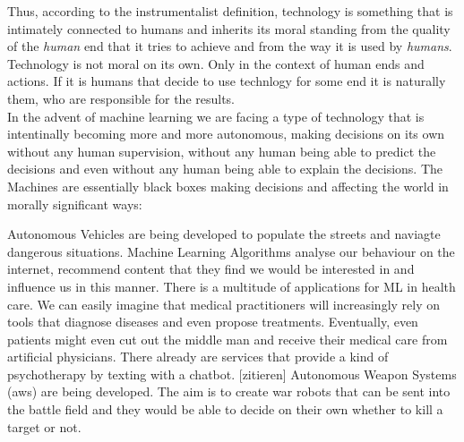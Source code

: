 \documentclass{article}
\begin{document}
Thus, according to the instrumentalist definition, technology is something that
is intimately connected to humans and inherits its moral standing from the
quality of the \textit{human} end that it tries to achieve and from the way
it is used by \textit{humans}. Technology is  not moral on its own. Only in the
context of human ends and actions. If it is humans that decide to use technlogy
for some end it is naturally them, who are responsible for the results.\\

In the advent of machine learning we are facing a type of technology that is
intentinally becoming more and more autonomous, making decisions on its own
without any human supervision, without any human being able to predict the
decisions and even without any human being able to explain the decisions. The
Machines are essentially black boxes making decisions and affecting the world in
morally significant ways:

Autonomous Vehicles are being developed to populate the streets and naviagte
dangerous situations.
Machine Learning Algorithms analyse our behaviour on the internet, recommend
content that they find we would be interested in and influence us in this
manner.
There is a multitude of applications for ML in health care. We can easily
imagine that medical practitioners will increasingly rely on tools that diagnose
diseases and even propose treatments. Eventually, even patients might even cut
out the middle man and receive their medical care from artificial physicians.
There already are services that provide a kind of psychotherapy by texting with
a chatbot. [zitieren]
Autonomous Weapon Systems (\acrshort{aws}) are being developed. The aim is to
create war robots that can be sent into the battle field and they would be able
to decide on their own whether to kill a target or not.




%
\end{document}
